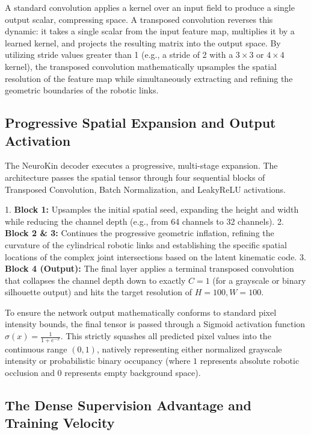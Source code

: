 \documentclass[12pt,a4paper,oneside]{report}
\begin{document}
A standard convolution applies a kernel over an input field to produce a single output scalar, compressing space. A transposed convolution reverses this dynamic: it takes a single scalar from the input feature map, multiplies it by a learned kernel, and projects the resulting matrix into the output space. By utilizing stride values greater than 1 (e.g., a stride of 2 with a $3 \times 3$ or $4 \times 4$ kernel), the transposed convolution mathematically upsamples the spatial resolution of the feature map while simultaneously extracting and refining the geometric boundaries of the robotic links.

\subsection{Progressive Spatial Expansion and Output Activation}

The NeuroKin decoder executes a progressive, multi-stage expansion. The architecture passes the spatial tensor through four sequential blocks of Transposed Convolution, Batch Normalization, and LeakyReLU activations.

1. \textbf{Block 1:} Upsamples the initial spatial seed, expanding the height and width while reducing the channel depth (e.g., from 64 channels to 32 channels).
2. \textbf{Block 2 \& 3:} Continues the progressive geometric inflation, refining the curvature of the cylindrical robotic links and establishing the specific spatial locations of the complex joint intersections based on the latent kinematic code.
3. \textbf{Block 4 (Output):} The final layer applies a terminal transposed convolution that collapses the channel depth down to exactly $C=1$ (for a grayscale or binary silhouette output) and hits the target resolution of $H=100, W=100$.

To ensure the network output mathematically conforms to standard pixel intensity bounds, the final tensor is passed through a Sigmoid activation function $\sigma(x) = \frac{1}{1 + e^{-x}}$. This strictly squashes all predicted pixel values into the continuous range $(0, 1)$, natively representing either normalized grayscale intensity or probabilistic binary occupancy (where $1$ represents absolute robotic occlusion and $0$ represents empty background space).

\subsection{The Dense Supervision Advantage and Training Velocity}
\end{document}

